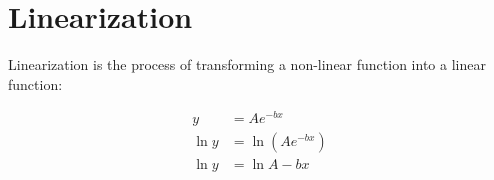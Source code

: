 \section{Linearization}

Linearization is the process of transforming a non-linear function into a linear function:

\begin{align*}
    y &= Ae^{-bx}           \\
    \ln y &= \ln (Ae^{-bx}) \\
    \ln y &= \ln A - bx
\end{align*}